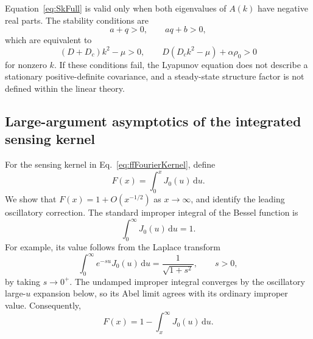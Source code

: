\documentclass{article}
\begin{document}
Equation~\eqref{eq:SkFull} is valid only when both eigenvalues of $A(k)$ have negative real parts. The stability conditions are
\begin{equation}
    a+q>0,
    \qquad aq+b>0,
\end{equation}
which are equivalent to
\begin{equation}
    (D+D_c)k^2-\mu>0,
    \qquad D(D_ck^2-\mu)+\alpha\rho_0>0
\end{equation}
for nonzero $k$. If these conditions fail, the Lyapunov equation does not describe a stationary positive-definite covariance, and a steady-state structure factor is not defined within the linear theory.

\subsection{Large-argument asymptotics of the integrated sensing kernel}
\label{appendix:ffIntegratedKernel}

For the sensing kernel in Eq.~\eqref{eq:ffFourierKernel}, define
\begin{equation}
    F(x)=\int_0^x J_0(u)\,\mathrm du.
\end{equation}
We show that $F(x)=1+O(x^{-1/2})$ as $x\to\infty$, and identify the leading oscillatory correction. The standard improper integral of the Bessel function is
\begin{equation}
    \int_0^\infty J_0(u)\,\mathrm du=1.
    \label{eq:ffBesselTotalIntegral}
\end{equation}
For example, its value follows from the Laplace transform
\begin{equation}
    \int_0^\infty e^{-s u}J_0(u)\,\mathrm du
    =\frac{1}{\sqrt{1+s^2}},\qquad s>0,
\end{equation}
by taking $s\to0^+$. The undamped improper integral converges by the oscillatory large-$u$ expansion below, so its Abel limit agrees with its ordinary improper value. Consequently,
\begin{equation}
    F(x)=1-\int_x^\infty J_0(u)\,\mathrm du.
    \label{eq:ffBesselTail}
\end{equation}
\end{document}
